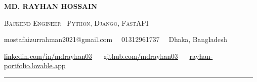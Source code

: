 \documentclass[a4paper,10pt]{article}
\newcommand{\dotsep}{\ \textperiodcentered\ }
\begin{document}
\begin{center}
  {\Huge\bfseries MD. RAYHAN HOSSAIN}\par\vspace{4pt}
  {\large\color{accent}\scshape Backend Engineer \textbar\ Python, Django, FastAPI}\par\vspace{6pt}
  {\small mostafaizurrahman2021@gmail.com \dotsep 01312961737 \dotsep Dhaka, Bangladesh}\par\vspace{2.5pt}
  {\small \href{https://www.linkedin.com/in/mdrayhan03/}{linkedin.com/in/mdrayhan03} \dotsep
          \href{https://github.com/mdrayhan03}{github.com/mdrayhan03} \dotsep
          \href{https://rayhan-portfolio.lovable.app}{rayhan-portfolio.lovable.app}}
\end{center}
\vspace{4pt}\noindent\textcolor{hairline}{\rule{\textwidth}{1pt}}\par\vspace{2pt}
\end{document}
